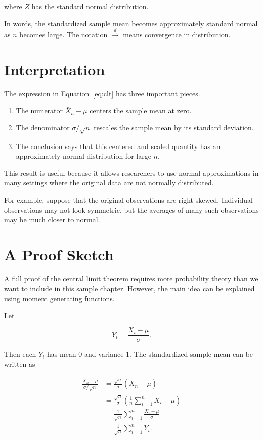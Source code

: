 where \(Z\) has the standard normal distribution.

In words, the standardized sample mean becomes approximately standard normal as \(n\) becomes large. The notation \(\xrightarrow{d}\) means convergence in distribution.

\section{Interpretation}
\label{sec:clt-interpretation}

The expression in Equation~\ref{eq:clt} has three important pieces.

\begin{enumerate}
  \item The numerator \(\bar{X}_n-\mu\) centers the sample mean at zero.
  \item The denominator \(\sigma/\sqrt{n}\) rescales the sample mean by its standard deviation.
  \item The conclusion says that this centered and scaled quantity has an approximately normal distribution for large \(n\).
\end{enumerate}

This result is useful because it allows researchers to use normal approximations in many settings where the original data are not normally distributed.

For example, suppose that the original observations are right-skewed. Individual observations may not look symmetric, but the averages of many such observations may be much closer to normal.

\section{A Proof Sketch}
\label{sec:clt-proof-sketch}

A full proof of the central limit theorem requires more probability theory than we want to include in this sample chapter. However, the main idea can be explained using moment generating functions.

Let

\begin{equation}
Y_i = \frac{X_i-\mu}{\sigma}.
\label{eq:standardized-observation}
\end{equation}

Then each \(Y_i\) has mean \(0\) and variance \(1\). The standardized sample mean can be written as

\begin{align}
\frac{\bar{X}_n-\mu}{\sigma/\sqrt{n}}
&= \frac{\sqrt{n}}{\sigma}\left(\bar{X}_n-\mu\right) \\
&= \frac{\sqrt{n}}{\sigma}
   \left(
     \frac{1}{n}\sum_{i=1}^{n}X_i-\mu
   \right) \\
&= \frac{1}{\sqrt{n}}\sum_{i=1}^{n}
   \frac{X_i-\mu}{\sigma} \\
&= \frac{1}{\sqrt{n}}\sum_{i=1}^{n}Y_i.
\label{eq:standardized-mean}
\end{align}

